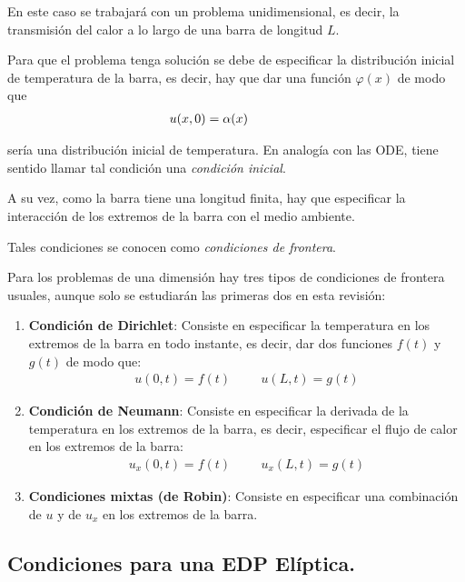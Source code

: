 En este caso se trabajará con un problema unidimensional, es decir, la transmisión del calor a lo largo de una barra de longitud $L$.
\par
Para que el problema tenga solución se debe de especificar la distribución inicial de temperatura de la barra, es decir, hay que dar una función $\varphi (x)$ de modo que
\begin{align}
u(x, 0) = \alpha (x) \hspace{1.5cm} 
\label{eq:ecuacion_06_02_02}
\end{align}

sería una distribución inicial de temperatura. En analogía con las ODE, tiene sentido llamar tal condición una \emph{condición inicial}.
\par
A su vez, como la barra tiene una longitud finita, hay que especificar la interacción de los extremos de la barra con el medio ambiente.

Tales condiciones se conocen como \emph{condiciones de frontera}.

Para los problemas de una dimensión hay tres tipos de condiciones de frontera usuales, aunque solo se estudiarán las primeras dos en esta revisión:
\begin{enumerate}
\item \textbf{Condición de Dirichlet}:
Consiste en especificar la temperatura en los extremos de la barra en todo instante, es decir, dar dos funciones $f(t)$ y $g(t)$ de modo que:
\begin{align}
u(0, t) = f (t)  \hspace{1cm} u(L, t) = g(t)
\label{eq:ecuacion_06_02_03}    
\end{align}
\item \textbf{Condición de Neumann}:
Consiste en especificar la derivada de la temperatura en los extremos de la barra, es decir, especificar el flujo de calor en los extremos de la barra:
\begin{align}
u_{x}(0,t) = f(t) \hspace{1cm} u_{x}(L,t) = g(t)
\label{eq:ecuacion_06_02_04}    
\end{align}
\item \textbf{Condiciones mixtas (de Robin)}:
Consiste en especificar una combinación de $u$ y de $u_{x}$ en los extremos de la barra.
\end{enumerate}

\subsection{Condiciones para una EDP Elíptica.}

